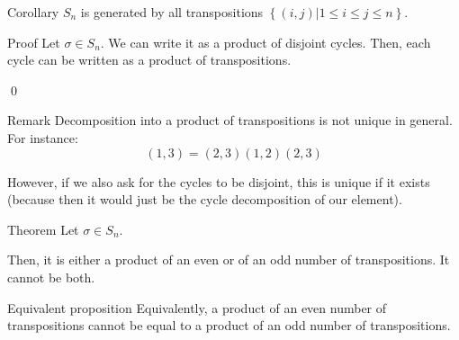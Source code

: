 \documentclass[a4paper]{article}
\begin{document}
\begin{parag}{Corollary}
    $S_n$ is generated by all transpositions $\left\{\left(i, j\right) | 1 \leq i \leq j \leq n\right\}$.

    \begin{subparag}{Proof}
        Let $\sigma \in S_n$. We can write it as a product of disjoint cycles. Then, each cycle can be written as a product of transpositions.

        \qed
    \end{subparag}

    \begin{subparag}{Remark}
        Decomposition into a product of transpositions is not unique in general. For instance:
        \[\left(1, 3\right) = \left(2, 3\right)\left(1,2\right)\left(2, 3\right)\]

        However, if we also ask for the cycles to be disjoint, this is unique if it exists (because then it would just be the cycle decomposition of our element).
    \end{subparag}
\end{parag}

\begin{parag}{Theorem}
    Let $\sigma \in S_n$.

    Then, it is either a product of an even or of an odd number of transpositions. It cannot be both.

    \begin{subparag}{Equivalent proposition}
        Equivalently, a product of an even number of transpositions cannot be equal to a product of an odd number of transpositions.
    \end{subparag}
\end{parag}
\end{document}
